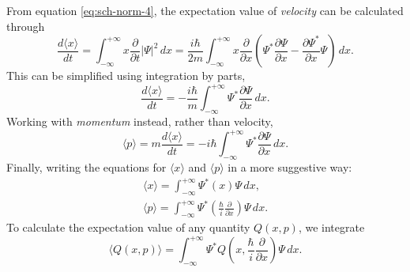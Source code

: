 \documentclass{article}
\begin{document}
From equation \eqref{eq:sch-norm-4}, the expectation value of \emph{velocity}
can be calculated through \[
  \frac{d\langle x \rangle}{dt}
  = \int_{-\infty}^{+\infty} x \frac{\partial}{\partial t} |\Psi|^2 \,dx
  = \frac{i\hbar}{2m} \int_{-\infty}^{+\infty} x\frac{\partial}{\partial x}
  \left(
    \Psi^*\frac{\partial \Psi}{\partial x} -
    \frac{\partial \Psi^*}{\partial x}\Psi
  \right) \,dx.
\]
This can be simplified using integration by parts, \[
  \frac{d\langle x \rangle}{dt}
  = -\frac{i\hbar}{m} \int_{-\infty}^{+\infty} \Psi^*
  \frac{\partial \Psi}{\partial x} \,dx.
\]
Working with \emph{momentum} instead, rather than velocity, \[
  \langle p \rangle
  = m \frac{d \langle x \rangle}{dt}
  = -i\hbar \int_{-\infty}^{+\infty}
    \Psi^*\frac{\partial \Psi}{\partial x}
  \,dx.
\]
Finally, writing the equations for $\langle x \rangle$ and $\langle p \rangle$
in a more suggestive way:
\begin{gather}
  \label{eq:sch-vel}
  \langle x \rangle = \int_{-\infty}^{+\infty} \Psi^* (x) \Psi \,dx, \\
  \label{eq:sch-mom}
  \langle p \rangle
  = \int_{-\infty}^{+\infty} \Psi^*\left(
    \frac{\hbar}{i} \frac{\partial}{\partial x}
  \right)\Psi \,dx.
\end{gather}
To calculate the expectation value of any quantity $Q(x, p)$, we integrate
\begin{equation} \label{eq:sch-qty}
  \boxed{
    \langle Q(x, p) \rangle = \int_{-\infty}^{+\infty} \Psi^* Q\left(
      x, \frac{\hbar}{i}\frac{\partial}{\partial x}
    \right)\Psi \,dx.
  }
\end{equation}
\end{document}
